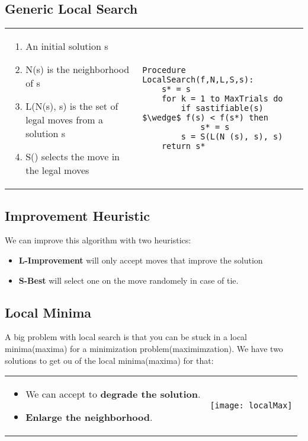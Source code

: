 
\subsection{Generic Local Search}
\begin{tabular}{m{9cm}m{7cm}}
\begin{enumerate}
    \item An initial solution s
    \item N(s) is the neighborhood of s
    \item L(N(s), s) is the set of legal moves from a solution s
    \item S() selects the move in the legal moves
\end{enumerate}
&
\begin{lstlisting}[mathescape]
Procedure LocalSearch(f,N,L,S,s):
    s* = s
    for k = 1 to MaxTrials do
        if sastifiable(s) $\wedge$ f(s) < f(s*) then
            s* = s
        s = S(L(N (s), s), s)
    return s*
\end{lstlisting}
\end{tabular}

\subsection{Improvement Heuristic}
We can improve this algorithm with two heuristics:
\begin{itemize}
    \item  \textbf{L-Improvement} will only accept moves that improve the solution
    \item \textbf{S-Best} will select one on the move randomely in case of tie.
\end{itemize}

\subsection{Local Minima}

A big problem with local search is that you can be stuck in a local minima(maxima) for a minimization problem(maximimzation).
We have two solutions to get ou of the local minima(maxima) for that:

\begin{tabular}{m{10cm}m{3cm}}
\begin{itemize}
    \item We can accept to \textbf{degrade the solution}.
    \item \textbf{Enlarge the neighborhood}.
\end{itemize}
&
\texttt{[image: localMax]}
\end{tabular}

